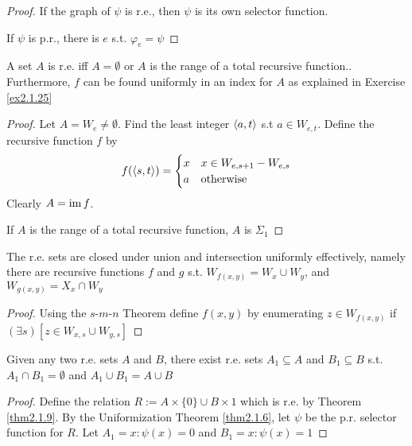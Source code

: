 \documentclass[11pt]{article}
\begin{document}
\begin{proof}
If the graph of \(\psi\) is r.e., then \(\psi\) is its own selector function.

If \(\psi\) is p.r., there is \(e\) s.t. \(\varphi_e=\psi\)
\end{proof}

\begin{theorem}
A set \(A\) is r.e. iff \(A=\emptyset\) or \(A\) is the range of a total
recursive function.. Furthermore, \(f\) can be found uniformly in an index
for \(A\) as explained in Exercise \ref{ex2.1.25}
\end{theorem}

\begin{proof}
Let \(A=W_e\neq\emptyset\). Find the least integer \(\langle a,t\rangle\) s.t
\(a\in W_{e,t}\). Define the recursive function \(f\) by
\begin{equation*}
f(\langle s,t\rangle)=
\begin{cases}
x&x\in W_{e,s+1}-W_{e,s}\\
a&\text{otherwise}
\end{cases}
\end{equation*}
Clearly \(A=\operatorname{im} f\).

If \(A\) is the range of a total recursive function, \(A\) is \(\Sigma_1\)
\end{proof}

\begin{theorem}
\label{thm2.1.9}
The r.e. sets are closed under union and intersection uniformly effectively,
namely there are recursive functions \(f\) and \(g\) s.t.
\(W_{f(x,y)}=W_x\cup W_y\), and \(W_{g(x,y)}=X_x\cap W_y\)
\end{theorem}

\begin{proof}
Using the \(s\)-\(m\)-\(n\) Theorem define \(f(x,y)\) by enumerating
\(z\in W_{f(x,y)}\) if \((\exists s)[z\in W_{x,s}\cup W_{y,s}]\)
\end{proof}

\begin{corollary}
Given any two r.e. sets \(A\) and \(B\), there exist r.e. sets
\(A_1\subseteq A\) and \(B_1\subseteq B\) s.t. \(A_1\cap B_1=\emptyset\) and
\(A_1\cup B_1=A\cup B\)
\end{corollary}

\begin{proof}
Define the relation \(R:=A\times\{0\}\cup B\times{1}\) which is r.e. by
Theorem \ref{thm2.1.9}. By the Uniformization Theorem \ref{thm2.1.6}, let \(\psi\) be
the p.r. selector function for \(R\). Let \(A_1=x:\psi(x)=0\) and
\(B_1=x:\psi(x)=1\) 
\end{proof}
\end{document}
